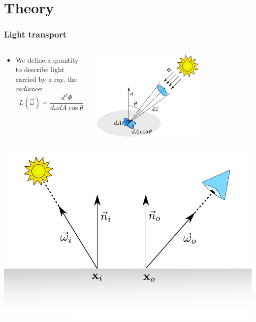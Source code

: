 \documentclass{beamer}
\newcommand{\vomega}{\vec{\omega}}
\begin{document}
\section{Theory}
\begin{frame}
    \frametitle{Light transport}
				\vspace{0.5cm}

\begin{columns}
    \begin{column}{0.5\textwidth}
			\begin{itemize}
				\item We define a quantity to describe light carried by a ray, the \emph{radiance}:
			  $$L(\vomega) = \frac{d^2 \Phi}{d\omega dA \cos \theta}$$
			\end{itemize}
    \end{column}
    \begin{column}{0.5\textwidth}
		\centering
		\includegraphics[width=0.7\textwidth]{radiance}
    \end{column}
​  \end{columns}
\vspace{0.3cm}
\begin{columns}
    \begin{column}{0.4\textwidth}
      \centering
		\includegraphics[width=\textwidth]{bssrdf}

\end{column}
\end{columns}
\end{frame}
\end{document}
